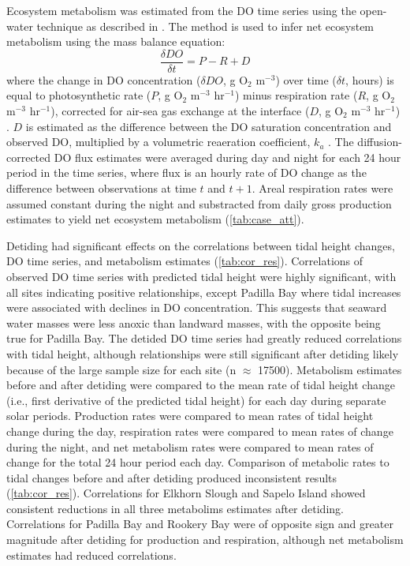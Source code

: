 \documentclass[letterpaper,12pt,oneside]{article}\usepackage[]{graphicx}\usepackage[]{color}
\begin{document}
Ecosystem metabolism was estimated from the \ac{DO} time series using the open-water technique \citep{Odum56} as described in \citet{Caffrey13}.  The method is used to infer net ecosystem metabolism using the mass balance equation:
\begin{equation} \label{metrate}
\frac{\delta DO}{\delta t} = P - R + D
\end{equation}
where the change in \ac{DO} concentration ($\delta DO$, g O$_2$ m$^{-3}$) over time ($\delta t$, hours) is equal to photosynthetic rate ($P$, g O$_2$ m$^{-3}$ hr$^{-1}$) minus respiration rate ($R$, g O$_2$ m$^{-3}$ hr$^{-1}$), corrected for air-sea gas exchange at the interface ($D$, g O$_2$ m$^{-3}$ hr$^{-1}$) \citep{Caffrey13}. $D$ is estimated as the difference between the \ac{DO} saturation concentration and observed \ac{DO}, multiplied by a volumetric reaeration coefficient, $k_a$ \citep{Thebault08}.  The diffusion-corrected \ac{DO} flux estimates were averaged during day and night for each 24 hour period in the time series, where flux is an hourly rate of \ac{DO} change as the difference between observations at time $t$ and $t+1$.  Areal respiration rates were assumed constant during the night and substracted from daily gross production estimates to yield net ecosystem metabolism (\cref{tab:case_att}).  

Detiding had significant effects on the correlations between tidal height changes, \ac{DO} time series, and metabolism estimates (\cref{tab:cor_res}).  Correlations of observed \ac{DO} time series with predicted tidal height were highly significant, with all sites indicating positive relationships, except Padilla Bay where tidal increases were associated with declines in \ac{DO}  concentration.  This suggests that seaward water masses were less anoxic than landward masses, with the opposite being true for Padilla Bay. The detided \ac{DO} time series had greatly reduced correlations with tidal height, although relationships were still significant after detiding likely because of the large sample size for each site (n $\approx$ 17500). Metabolism estimates before and after detiding were compared to the mean rate of tidal height change (i.e., first derivative of the predicted tidal height) for each day during separate solar periods.  Production rates were compared to mean rates of tidal height change during the day, respiration rates were compared to mean rates of change during the night, and net metabolism rates were compared to mean rates of change for the total 24 hour period each day.  Comparison of metabolic rates to tidal changes before and after detiding produced inconsistent results (\cref{tab:cor_res}).  Correlations for Elkhorn Slough and Sapelo Island showed consistent reductions in all three metabolims estimates after detiding.  Correlations for Padilla Bay and Rookery Bay were of opposite sign and greater magnitude after detiding for production and respiration, although net metabolism estimates had reduced correlations.  
\end{document}
